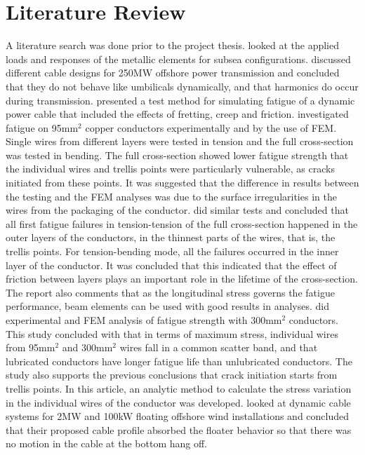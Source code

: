 \section{Literature Review}
A literature search was done prior to the project thesis. \cite{Feld1995} looked at the applied loads and responses of the metallic elements for subsea configurations. \cite{Chien2004} discussed different cable designs for 250MW offshore power transmission and concluded that they do not behave like umbilicals dynamically, and that harmonics do occur during transmission. \cite{Karlsen2010} presented a test method for simulating fatigue of a dynamic power cable that included the effects of fretting, creep and friction. \cite{Nasution2013} investigated fatigue on 95mm$^2$ copper conductors experimentally and by the use of FEM. Single wires from different layers were tested in tension and the full cross-section was tested in bending. The full cross-section showed lower fatigue strength that the individual wires and trellis points were particularly vulnerable, as cracks initiated from these points. It was suggested that the difference in results between the testing and the FEM analyses was due to the surface irregularities in the wires from the packaging of the conductor. \cite{NASUTION2014} did similar tests and concluded that all first fatigue failures in tension-tension of the full cross-section happened in the outer layers of the conductors, in the thinnest parts of the wires, that is, the trellis points. For tension-bending mode, all the failures occurred in the inner layer of the conductor. It was concluded that this indicated that the effect of friction between layers plays an important role in the lifetime of the cross-section. The report also comments that as the longitudinal stress governs the fatigue performance, beam elements can be used with good results in analyses. \cite{savik2014} did experimental and FEM analysis of fatigue strength with 300mm$^2$ conductors. This study concluded with that in terms of maximum stress, individual wires from 95mm$^2$  and 300mm$^2$ wires fall in a common scatter band, and that lubricated conductors have longer fatigue life than unlubricated conductors. The study also supports the previous conclusions that crack initiation starts from trellis points. In this article, an analytic method to calculate the stress variation in the individual wires of the conductor was developed. \cite{Taninok2017} looked at dynamic cable systems for 2MW and 100kW floating offshore wind installations and concluded that their proposed cable profile absorbed the floater behavior so that there was no motion in the cable at the bottom hang off.  


